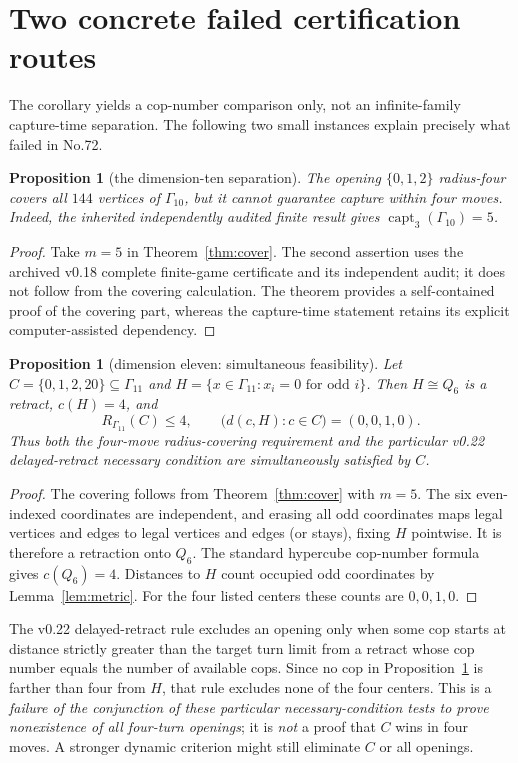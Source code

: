 \documentclass[10pt]{article}
\newtheorem{proposition}[theorem]{Proposition}
\newcommand{\Ga}{\Gamma}
\newcommand{\capt}{\operatorname{capt}}
\begin{document}
\section{Two concrete failed certification routes}
The corollary yields a cop-number comparison only, not an
infinite-family capture-time separation. The following two small
instances explain precisely what failed in No.72.

\begin{proposition}[the dimension-ten separation]\label{prop:ten}
The opening $\{0,1,2\}$ radius-four covers all $144$ vertices
of $\Ga_{10}$, but it cannot guarantee capture within four moves.
Indeed, the inherited independently audited finite result gives
$\capt_3(\Ga_{10})=5$.
\end{proposition}
\begin{proof}
Take $m=5$ in Theorem~\ref{thm:cover}. The second assertion uses
the archived v0.18 complete finite-game certificate and its independent
audit; it does not follow from the covering calculation. The theorem
provides a self-contained proof of the covering part, whereas the
capture-time statement retains its explicit computer-assisted dependency.
\end{proof}

\begin{proposition}[dimension eleven: simultaneous feasibility]\label{prop:eleven}
Let $C=\{0,1,2,20\}\subseteq\Ga_{11}$ and
$H=\{x\in\Ga_{11}:x_i=0\text{ for odd }i\}$.
Then $H\cong Q_6$ is a retract, $c(H)=4$, and
\[
 R_{\Ga_{11}}(C)\le4,\qquad
 \bigl(d(c,H):c\in C\bigr)=(0,0,1,0).
\]
Thus both the four-move radius-covering requirement and the
particular v0.22 delayed-retract necessary condition are simultaneously
satisfied by $C$.
\end{proposition}
\begin{proof}
The covering follows from Theorem~\ref{thm:cover} with $m=5$.
The six even-indexed coordinates are independent, and erasing all odd
coordinates maps legal vertices and edges to legal vertices and edges
(or stays), fixing $H$ pointwise. It is therefore a retraction onto
$Q_6$. The standard hypercube cop-number formula gives $c(Q_6)=4$.
Distances to $H$ count occupied odd coordinates by Lemma~\ref{lem:metric}.
For the four listed centers these counts are $0,0,1,0$.
\end{proof}

The v0.22 delayed-retract rule excludes an opening only when some cop
starts at distance strictly greater than the target turn limit from a
retract whose cop number equals the number of available cops. Since no
cop in Proposition~\ref{prop:eleven} is farther than four from $H$,
that rule excludes none of the four centers. This is a \emph{failure of
the conjunction of these particular necessary-condition tests to prove
nonexistence of all four-turn openings}; it is \emph{not} a proof that
$C$ wins in four moves. A stronger dynamic criterion might still
eliminate $C$ or all openings.
\end{document}
